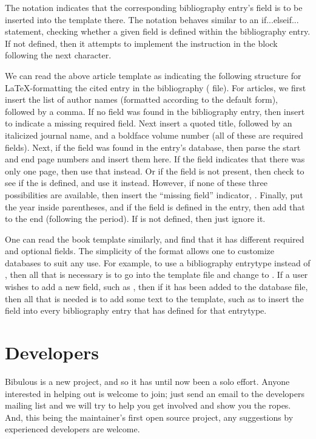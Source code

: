 \documentclass[letterpaper,10pt,english]{sphinxmanual}
\begin{document}
The  notation indicates that the corresponding bibliography entry's field is to be inserted into the template there. The \code{{[}...\textbar{}...{]}} notation behaves similar to an if...elseif... statement, checking whether a given field is defined within the bibliography entry. If not defined, then it attempts to implement the instruction in the block following the next \code{\textbar{}} character.

We can read the above article template as indicating the following structure for LaTeX-formatting the cited entry in the bibliography ( file). For articles, we first insert the list of author names (formatted according to the default form), followed by a comma. If no  field was found in the bibliography entry, then insert  to indicate a missing required field. Next insert a quoted title, followed by an italicized journal name, and a boldface volume number (all of these are required fields). Next, if the  field was found in the entry's database, then parse the start and end page numbers and insert them here. If the  field indicates that there was only one page, then use that instead. Or if the  field is not present, then check to see if the  is defined, and use it instead. However, if none of these three possibilities are available, then insert the “missing field” indicator, . Finally, put the year inside parentheses, and if the  field is defined in the entry, then add that to the end (following the period). If  is not defined, then just ignore it.

One can read the book template similarly, and find that it has different required and optional fields. The simplicity of the format allows one to customize databases to suit any use. For example, to use a bibliography entrytype  instead of , then all that is necessary is to go into the template file and change  to . If a user wishes to add a new field, such as , then if it has been added to the  database file, then all that is needed is to add some text to the template, such as  to insert the field into every bibliography entry that has  defined for that entrytype.


\section{Developers}
\label{index:developers}
Bibulous is a new project, and so it has until now been a solo effort. Anyone interested in helping out is welcome to join; just send an email to the developers mailing list and we will try to help you get involved and show you the ropes. And, this being the maintainer's first open source project, any suggestions by experienced developers are welcome.
\end{document}
